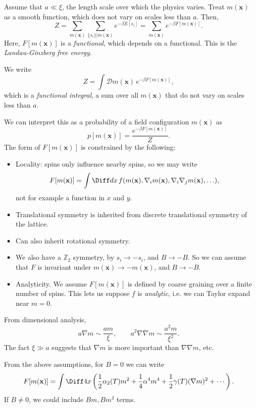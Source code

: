 \documentclass[12pt]{article}
\begin{document}
Assume that $a \ll \xi$, the length scale over which the physics varies. Treat $m(\mathbf{x})$ as a smooth function, which does not vary on scales less than $a$. Then,
\[
	Z = \sum_{m(\mathbf{x})} \sum_{\{s_i\} | m(\mathbf{x})} e^{-\beta E[s_i]} = \sum_{m (\mathbf{x})} e^{-\beta F[m(\mathbf{x})]}.
\]
Here, $F[m(\mathbf{x})]$ is a \emph{functional}, which depends on a functional. This is the \emph{Landau-Ginzberg free energy}.

We write
\[
	Z = \int \mathcal{D} m(\mathbf{x}) \, e^{-\beta F[m(\mathbf{x})]},
\]
which is a \emph{functional integral}, a sum over all $m(\mathbf{x})$ that do not vary on scales less than $a$.


We can interpret this as a probability of a field configuration $m(\mathbf{x})$ as
\[
	p[m(\mathbf{x})] = \frac{e^{-\beta F[m(\mathbf{x})]}}{Z}.
\]
The form of $F[m(\mathbf{x})]$ is constrained by the following:
\begin{itemize}
	\item Locality: spins only influence nearby spins, so we may write
		\[
			F[m(\mathbf{x})] = \int \Diff dx\, f(m(\mathbf{x}), \nabla_i m(\mathbf{x}), \nabla_i \nabla_j m(\mathbf{x}), \ldots),
		\]
		not for example a function in $x$ and $y$.
	\item Translational symmetry is inherited from discrete translational symmetry of the lattice.
	\item Can also inherit rotational symmetry.
	\item We also have a $\mathbb{Z}_2$ symmetry, by $s_i \to -s_i$, and $B \to -B$. So we can assume that $F$ is invariant under $m(\mathbf{x}) \to - m(\mathbf{x})$, and $B \to -B$.
	\item Analyticity. We assume $F[m(\mathbf{x})]$ is defined by coarse graining over a finite number of spins. This lets us suppose $f$ is \emph{analytic}, i.e. we can Taylor expand near $m = 0$.
\end{itemize}

From dimensional analysis,
\[
a \nabla m \sim \frac{a m}{\xi}, \qquad a^2 \nabla \nabla m \sim \frac{a^2 m}{\xi^2}.
\]
The fact $\xi \gg a$ suggests that $\nabla m$ is more important than $\nabla \nabla m$, etc.

From the above assumptions, for $B = 0$ we can write
\[
	F[m(\mathbf{x})] = \int \Diff4 x \left( \frac{1}{2} \alpha_2(T) m^2 + \frac{1}{4} \alpha^4 m^4 + \frac{1}{2} \gamma(T) (\nabla m)^2 + \cdots \right).
\]
If $B \neq 0$, we could include $Bm, Bm^3$ terms.
\end{document}
